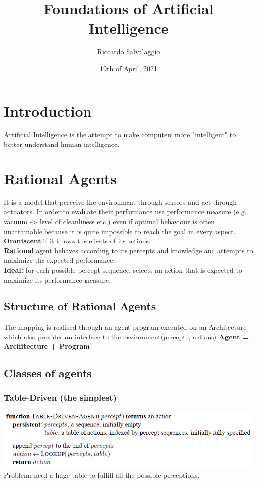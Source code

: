 \documentclass{article}
\title{Foundations of Artificial Intelligence}
\author{Riccardo Salvalaggio}
\date{19th of April, 2021}
\begin{document}
\maketitle
\newpage
\tableofcontents
\newpage

\section{Introduction}
Artificial Intelligence is the attempt to make computers more "intelligent" to better understand human intelligence.
\section{Rational Agents}
It is a model that perceive the environment through sensors and act through actuators. In order to evaluate their performance use performance measure (e.g. vacuum -> level of cleanliness etc.) even if optimal behaviour is often unattainable because it is quite impossible to reach the goal in every aspect.\\ \textbf{Omniscent }if it knows the effects of its actions.\\ \textbf{Rational} agent behaves according to its percepts and knowledge and attempts to maximize the expected performance.\\ \textbf{Ideal: }for each possible percept sequence, selects an action that is expected to maximize its performance measure.
\subsection{Structure of Rational Agents}
The mapping is realised through an agent program executed on an Architecture which also provides an interface to the environment(percepts, actions)
\textbf{Agent = Architecture + Program}
\subsection{Classes of agents}
\subsubsection{Table-Driven (the simplest)}
\includegraphics[scale=0.8]{1.png}
Problem: need a huge table to fulfill all the possible perceptions.\\
\newpage
\end{document}
